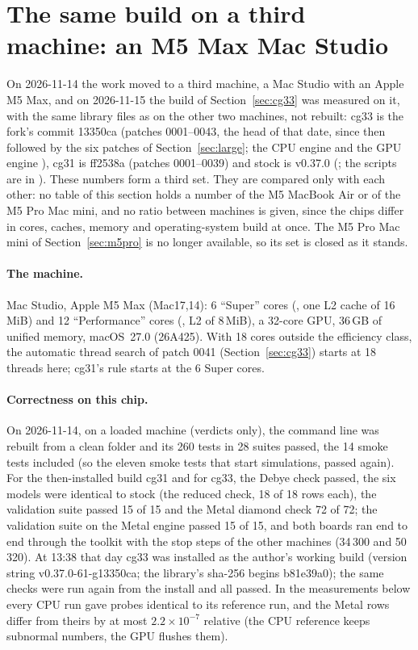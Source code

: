 \section{The same build on a third machine: an M5 Max Mac Studio}\label{sec:studio}

On 2026-11-14 the work moved to a third machine, a Mac Studio with an Apple M5 Max, and on 2026-11-15 the build of
Section~\ref{sec:cg33} was measured on it, with the same library files as on the other two machines, not rebuilt:
cg33 is the fork's commit 13350ca (patches 0001--0043, the head of that date, since then followed by the six patches of Section~\ref{sec:large}; the CPU engine  and the GPU engine
), cg31 is ff2538a (patches 0001--0039) and stock is v0.37.0
(; the scripts are in ). These numbers form a
third set. They are compared only with each other: no table of this section holds a number of the M5 MacBook Air or of
the M5 Pro Mac mini, and no ratio between machines is given, since the chips differ in cores, caches, memory and
operating-system build at once. The M5 Pro Mac mini of Section~\ref{sec:m5pro} is no longer available, so its set is
closed as it stands.

\paragraph{The machine.} Mac Studio, Apple M5 Max (Mac17,14): 6 ``Super'' cores (, one L2 cache of
16\,MiB) and 12 ``Performance'' cores (, L2 of 8\,MiB), a 32-core GPU, 36\,GB of unified
memory, macOS~27.0 (26A425). With 18 cores outside the efficiency class, the automatic thread search of patch 0041
(Section~\ref{sec:cg33}) starts at 18 threads here; cg31's rule starts at the 6 Super cores.

\paragraph{Correctness on this chip.} On 2026-11-14, on a loaded machine (verdicts only), the command line was rebuilt
from a clean folder and its 260 tests in 28 suites passed, the 14 smoke tests included (so the eleven smoke tests that
start simulations, passed again). For the then-installed build cg31
and for cg33, the Debye check passed, the six models were identical to stock (the reduced check, 18 of 18 rows each),
the validation suite passed 15 of 15 and the Metal diamond check 72 of 72; the validation suite on the Metal engine
passed 15 of 15, and both boards ran end to end through the toolkit with the stop steps of the other machines (34\,300 and
50\,320). At 13:38 that day cg33 was installed as the author's working build (version string v0.37.0-61-g13350ca; the
library's sha-256 begins b81e39a0); the same checks were run again from the install and all passed. In the
measurements below every CPU run gave probes identical to its reference run, and the Metal rows differ from theirs by at
most $2.2\times10^{-7}$ relative (the CPU reference keeps subnormal numbers, the GPU flushes them).

